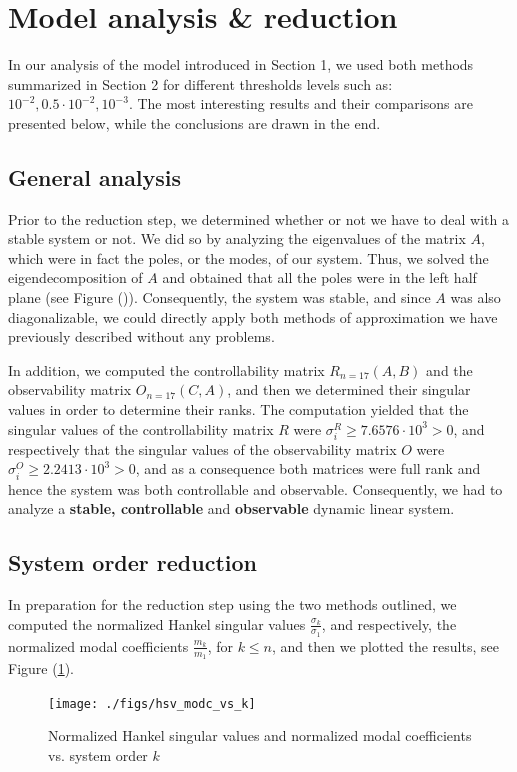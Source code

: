 \documentclass[10pt,a4paper]{article}
\begin{document}
\section{Model analysis \& reduction}
In our analysis of the model introduced in Section 1, we used both methods summarized in Section 2 for different thresholds levels such as: $10^{-2}, 0.5\cdot10^{-2}, 10^{-3}$. The most interesting results and their comparisons are presented below, while the conclusions are drawn in the end.

\subsection{General analysis}
Prior to the reduction step, we determined whether or not we have to deal with a stable system or not. We did so by analyzing the eigenvalues of the matrix $A$, which were in fact the poles, or the modes, of our system. Thus, we solved the eigendecomposition of $A$ and obtained that all the poles were in the left half plane (see Figure ()). Consequently, the system was stable, and since $A$ was also diagonalizable,  we could directly apply both methods of approximation we have previously described without any problems. 

In addition, we computed the controllability matrix $R_{n=17}(A,B)$ and the observability matrix $O_{n=17}(C,A)$, and then we determined their singular values in order to determine their ranks. The computation yielded that the singular values of the controllability matrix $R$ were $\sigma^{R}_i \geq 7.6576\cdot10^3 > 0$, and respectively that the  singular values of the observability matrix $O$ were $\sigma^{O}_i \geq 2.2413\cdot10^3 > 0$, and as a consequence both matrices were full rank and hence the system was both controllable and observable. Consequently, we had to analyze a \textbf{stable, controllable} and \textbf{observable} dynamic linear system.

\subsection{System order reduction}
In preparation for the reduction step using the two methods outlined, we computed the normalized Hankel singular values $\frac{\sigma_k}{\sigma_1}$, and respectively, the normalized modal coefficients $\frac{m_{k}}{m_{1}}$, for $k\leq n$, and then we plotted the results, see Figure (\ref{fig:svc_vs_k}).

\begin{figure}[!ht]
\centering
\texttt{[image: ./figs/hsv\_modc\_vs\_k]}
\caption{Normalized Hankel singular values and normalized modal coefficients vs. system order $k$}\label{fig:svc_vs_k}
\end{figure}
\end{document}

